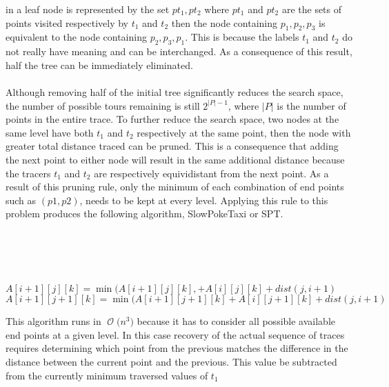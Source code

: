 \documentclass[12pt]{article}
\newcommand{\BigO}[1]{\ensuremath{\operatorname{\mathcal{O}}\bigl(#1\bigr)}}
\begin{document}
in a leaf node is represented by the set ${pt_1,pt_2}$ where 
$pt_1$ and $pt_2$ are the sets of points visited respectively
by $t_1$ and $t_2$ then the node containing ${{p_1},{p_2,p_3}}$
is equivalent to the node containing ${{p_2,p_3},{p_1}}$.  This
is because the labels $t_1$ and $t_2$ do not really have meaning
and can be interchanged.  As a consequence of this result, half the
tree can be immediately eliminated.\\\\
Although removing half of the initial tree significantly reduces
the search space, the number of possible tours remaining is still
$2^{|P|-1}$, where $|P|$ is the number of points in the entire 
trace.  To further reduce the search space, two nodes at the same
level have both $t_1$ and $t_2$ respectively at the same point, then
the node with greater total distance traced can be pruned.  This is
a consequence that adding the next point to either node will result
in the same additional distance because the tracers $t_1$ and $t_2$
are respectively equividistant from the next point.  As a result
of this pruning rule, only the minimum of each combination of end points
such as $(p1,p2)$, needs to be kept at every level.  Applying this
rule to this problem produces the following algorithm, SlowPokeTaxi or
SPT\@.\\\\
\begin{algorithm}[H]
\\
\\
\\
 {
     {
         {
             {
                $A[i+1][j][k] = \min(A[i+1][j][k], + A[i][j][k] + dist(j,i+1)$\\
                $A[i+1][j+1][k] = \min(A[i+1][j+1][k] + A[i][j+1][k] + dist(j,i+1)$\\
            }
        }
    }
}
\end{algorithm}
This algorithm runs in \BigO{n^3} because it has to consider all
possible available end points at a given level.  In this case
recovery of the actual sequence of traces requires determining
which point from the previous matches the difference in the 
distance between the current point and the previous.  This value
be subtracted from the currently minimum traversed values of $t_1$
\end{document}
